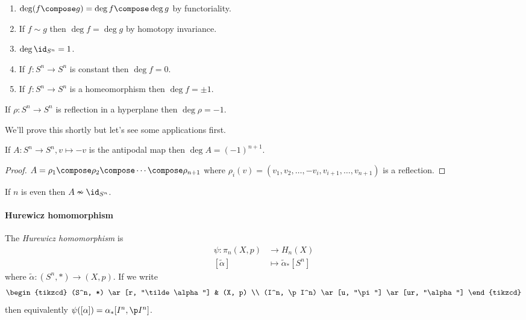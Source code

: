 \documentclass[a4paper]{article}
\renewcommand{\b}{\p}
\begin{document}
\begin{proposition}\leavevmode
  \begin{enumerate}
  \item \(\deg (f \compose g) = \deg f \compose \deg g\) by functoriality.
  \item If \(f \sim g\) then \(\deg f = \deg g\) by homotopy invariance.
  \item \(\deg \id_{S^n} = 1\).
  \item If \(f: S^n \to S^n\) is constant then \(\deg f = 0\).
  \item If \(f: S^n \to S^n\) is a homeomorphism then \(\deg f = \pm 1\).
  \end{enumerate}
\end{proposition}

\begin{proposition}
  If \(\rho: S^n \to S^n\) is reflection in a hyperplane then \(\deg \rho = -1\).
\end{proposition}

We'll prove this shortly but let's see some applications first.

\begin{corollary}
  If \(A: S^n \to S^n, v \mapsto -v\) is the antipodal map then \(\deg A = (-1)^{n + 1}\).
\end{corollary}

\begin{proof}
  \(A = \rho_1 \compose \rho_2 \compose \cdots \compose \rho_{n + 1}\) where \(\rho_i(v) = (v_1, v_2, \dots, -v_i, v_{i + 1}, \dots, v_{n + 1})\) is a reflection.
\end{proof}

\begin{corollary}
  If \(n\) is even then \(A \nsim \id_{S^n}\).
\end{corollary}

\paragraph{Hurewicz homomorphism}

\begin{definition}
  The \emph{Hurewicz homomorphism} is
  \begin{align*}
    \psi: \pi_n(X, p) &\to H_n(X) \\
    [\tilde \alpha] &\mapsto \tilde \alpha_*[S^n]
  \end{align*}
  where \(\tilde \alpha: (S^n, *) \to (X, p)\). If we write
  \[
    \begin{tikzcd}
      (S^n, *) \ar[r, "\tilde \alpha"] & (X, p) \\
      (I^n, \b I^n) \ar[u, "\pi"] \ar[ur, "\alpha"]
    \end{tikzcd}
  \]
  then equivalently \(\psi([\alpha]) = \alpha_*[I^n, \b I^n]\).
\end{definition}
\end{document}
